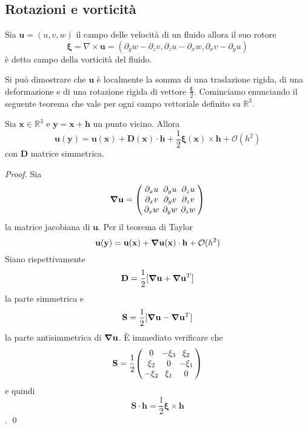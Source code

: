 \subsection{Rotazioni e vorticità}

Sia $\mathbf{u} = (u,v,w)$ il campo delle velocità di un fluido allora il suo rotore 
$$\boldsymbol{\xi} = \nabla \times \mathbf{u} = (\partial_y w - \partial_z v, \partial_z u - \partial_x w, \partial_x v - \partial_y u)$$
è detto campo della vorticità del fluido.

Si può dimostrare che $\mathbf{u}$ è localmente la somma di una traslazione rigida, di una deformazione e di una rotazione rigida di vettore $\frac{\boldsymbol{\xi}}{2}$. Cominciamo enunciando il seguente teorema che vale per ogni campo vettoriale definito su $\mathbb{R}^3$.

\begin{theorem}
Sia $\mathbf{x} \in \mathbb{R}^3$ e $\mathbf{y} = \mathbf{x} + \mathbf{h}$ un punto vicino. Allora 
\begin{equation}\label{eq:helmoltz}
\mathbf{u}(\mathbf{y}) = \mathbf{u}(\mathbf{x}) + \mathbf{D}(\mathbf{x}) \cdot \mathbf{h} + \frac{1}{2} \boldsymbol{\xi}(\mathbf{x}) \times \mathbf{h} + \mathcal{O} ( h^2)
\end{equation}
con $\mathbf{D}$ matrice simmetrica.
\end{theorem}
\begin{proof}
Sia
\begin{equation}
\Nabla\mathbf{u}={\setlength\arraycolsep{2pt} 
\left(\begin{array}{ccc} 
\partial_x u&  \partial_y u &\partial_z u\\ 
\partial_x v&  \partial_y v &\partial_z v\\ 
\partial_x w&  \partial_y w &\partial_z w\\
\end{array}\right) 
}
\end{equation}
la matrice jacobiana di $\mathbf{u}$.
Per il teorema di Taylor
$$\mathbf{u}(\mathbf{y}) = \mathbf{u}(\mathbf{x}) + \boldsymbol{\nabla}\mathbf{u}(\mathbf{x}) \cdot \mathbf{h} + \mathcal{O} ( h^2)$$
Siano rispettivamente
$$\mathbf{D} = \frac{1}{2} [ \boldsymbol{\nabla}\mathbf{u} + \boldsymbol{\nabla}\mathbf{u} ^T]$$
la parte simmetrica e
$$\mathbf{S} = \frac{1}{2} [ \boldsymbol{\nabla}\mathbf{u} - \boldsymbol{\nabla}\mathbf{u} ^T]$$
la parte antisimmetrica di $ \boldsymbol{\nabla}\mathbf{u}$.
\`E immediato verificare che
\begin{equation}
\mathbf{S}=\frac{1}{2}{\setlength\arraycolsep{2pt} 
\left(\begin{array}{ccc} 
0&  -\xi_3 &\xi_2\\ 
\xi_2&  0 &-\xi_1\\ 
-\xi_2&  \xi_1 &0\\
\end{array}\right) 
}
\end{equation}
e quindi
$$\mathbf{S} \cdot \mathbf{h} = \frac{1}{2} \boldsymbol{\xi} \times \mathbf{h}$$.
\qed
\end{proof}

